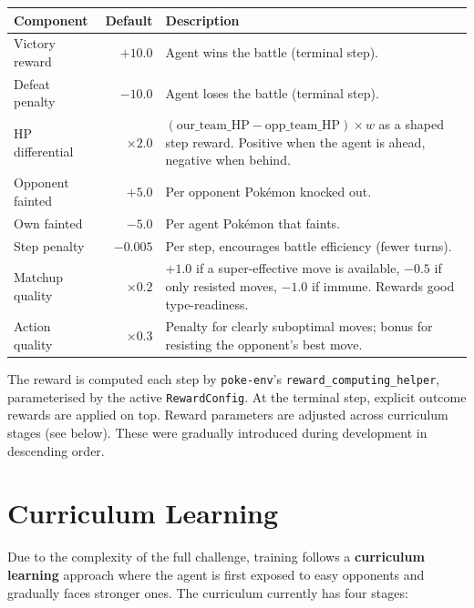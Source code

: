 \begin{center}
\small
\begin{tabularx}{\textwidth}{l r X}
  \toprule
  \textbf{Component} & \textbf{Default} & \textbf{Description} \\
  \midrule
  Victory reward     & $+10.0$  & Agent wins the battle (terminal step). \\
  Defeat penalty     & $-10.0$  & Agent loses the battle (terminal step). \\
  HP differential    & $\times 2.0$ &
    $(\text{our\_team\_HP} - \text{opp\_team\_HP}) \times w$ as a shaped
    step reward.  Positive when the agent is ahead, negative when behind. \\
  Opponent fainted   & $+5.0$   & Per opponent Pok\'{e}mon knocked out. \\
  Own fainted        & $-5.0$   & Per agent Pok\'{e}mon that faints. \\
  Step penalty       & $-0.005$ & Per step, encourages battle efficiency
                                    (fewer turns). \\
  Matchup quality    & $\times 0.2$ &
    $+1.0$ if a super-effective move is available, $-0.5$ if only resisted
    moves, $-1.0$ if immune.  Rewards good type-readiness. \\
  Action quality     & $\times 0.3$ &
    Penalty for clearly suboptimal moves; bonus for resisting the opponent's
    best move. \\
  \bottomrule
\end{tabularx}
\end{center}

The reward is computed each step by \texttt{poke-env}'s
\texttt{reward\_computing\_helper}, parameterised by the active
\texttt{RewardConfig}.  At the terminal step, explicit outcome rewards are
applied on top.  Reward parameters are adjusted across curriculum stages (see
below). These were gradually introduced during development in descending order.

\section{Curriculum Learning}
\label{sec:curriculum}

Due to the complexity of the full challenge, training follows a \textbf{curriculum
learning} approach where the agent is first exposed to easy opponents and
gradually faces stronger ones.  The curriculum currently has four stages:

